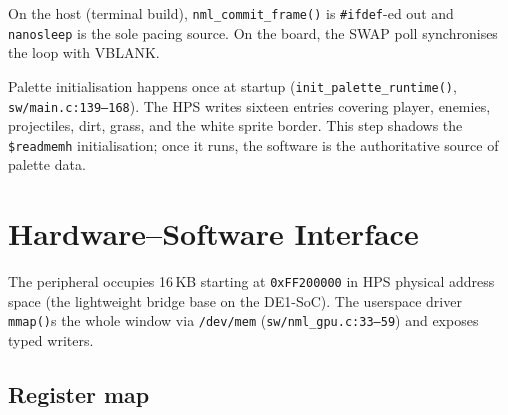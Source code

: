 \documentclass[11pt,letterpaper]{article}
\begin{document}
On the host (terminal build), \texttt{nml\_commit\_frame()} is
\texttt{\#ifdef}-ed out and \texttt{nanosleep} is the sole pacing source. On
the board, the SWAP poll synchronises the loop with VBLANK.

Palette initialisation happens once at startup
(\texttt{init\_palette\_runtime()}, \texttt{sw/main.c:139--168}). The HPS
writes sixteen entries covering player, enemies, projectiles, dirt, grass,
and the white sprite border. This step shadows the \texttt{\$readmemh}
initialisation; once it runs, the software is the authoritative source of
palette data.

\section{Hardware--Software Interface}

The peripheral occupies 16\,KB starting at \texttt{0xFF200000} in HPS
physical address space (the lightweight bridge base on the DE1-SoC). The
userspace driver \texttt{mmap()}s the whole window via \texttt{/dev/mem}
(\texttt{sw/nml\_gpu.c:33--59}) and exposes typed writers.

\subsection{Register map}
\end{document}
